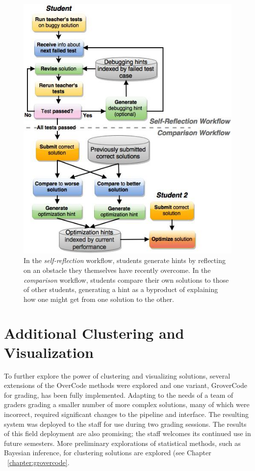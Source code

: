 \begin{figure}
\centering
\includegraphics[width=1.0\linewidth]{Body/figures/classoverflow/CombinedWorkflow_CameraReady_FIXED_2.jpg}
\caption{In the \textit{self-reflection} workflow, students generate hints by reflecting on an obstacle they themselves have recently overcome. In the \textit{comparison} workflow, students compare their own solutions to those of other students, generating a hint as a byproduct of explaining how one might get from one solution to the other.}
\label{fig:workflow}
\end{figure}


\section{Additional Clustering and Visualization}

To further explore the power of clustering and visualizing solutions, several extensions of the OverCode methods were explored and one variant, GroverCode for grading, has been fully implemented. Adapting to the needs of a team of graders grading a smaller number of more complex solutions, many of which were incorrect, required significant changes to the pipeline and interface. The resulting system was deployed to the staff for use during two grading sessions. The results of this field deployment are also promising; the staff welcomes its continued use in future semesters. More preliminary explorations of statistical methods, such as Bayesian inference, for clustering solutions are explored (see Chapter ~\ref{chapter:grovercode}.

